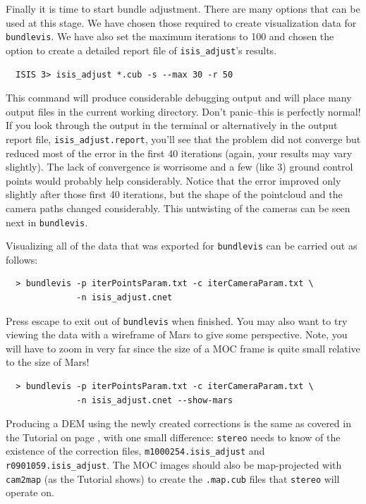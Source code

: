 Finally it is time to start bundle adjustment. There are many options
that can be used at this stage.  We have chosen those required to
create visualization data for \texttt{bundlevis}.  We have also set
the maximum iterations to 100 and chosen the option to create a
detailed report file of \texttt{isis\_adjust}'s results.

\begin{verbatim}
  ISIS 3> isis_adjust *.cub -s --max 30 -r 50
\end{verbatim}

This command will produce considerable debugging output and will
place many output files in the current working directory. Don't
panic--this is perfectly normal! If you look through the output in
the terminal or alternatively in the output report file,
\texttt{isis\_adjust.report}, you'll see that the problem did not
converge but reduced most of the error in the first 40 iterations
(again, your results may vary slightly). The lack of convergence
is worrisome and a few (like 3) ground control points would probably
help considerably.  Notice that the error improved only slightly
after those first 40 iterations, but the shape of the pointcloud and
the camera paths changed considerably. This untwisting of the
cameras can be seen next in \texttt{bundlevis}.

Visualizing all of the data that was exported for \texttt{bundlevis}
can be carried out as follows:

\begin{verbatim}
  > bundlevis -p iterPointsParam.txt -c iterCameraParam.txt \
              -n isis_adjust.cnet
\end{verbatim}

Press escape to exit out of \texttt{bundlevis} when finished.  You may
also want to try viewing the data with a wireframe of Mars to give
some perspective. Note, you will have to zoom in very far since the
size of a MOC frame is quite small relative to the size of Mars!

\begin{verbatim}
  > bundlevis -p iterPointsParam.txt -c iterCameraParam.txt \
              -n isis_adjust.cnet --show-mars
\end{verbatim}

Producing a DEM using the newly created corrections is the same as
covered in the Tutorial on page \pageref{ch:tutorial}, with one small
difference: \texttt{stereo} needs to know of the existence of the
correction files, \texttt{m1000254.isis\_adjust} and
\texttt{r0901059.isis\_adjust}.  The \ac{MOC} images should also be 
map-projected with \texttt{cam2map} (as the Tutorial shows) to create
the \texttt{.map.cub} files that \texttt{stereo} will operate on.

